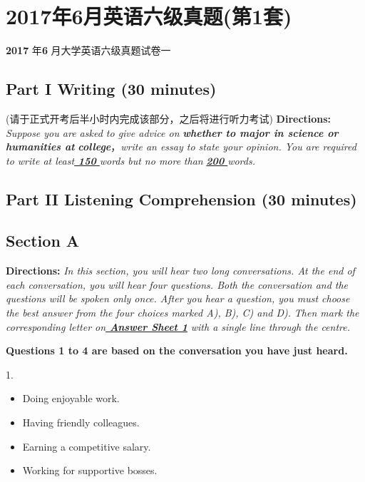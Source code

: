 \documentclass[UTF8,11pt]{ctexart}
\begin{document}
\section*{2017年6月英语六级真题(第1套)}
\textbf{2017} 年\textbf{6} 月大学英语六级真题试卷一


\subsection*{\textbf{Part I} \textbf{Writing} \textbf{(30 minutes)}}


(请于正式开考后半小时内完成该部分，之后将进行听力考试) \textbf{Directions:}\textit{ Suppose you are asked to give advice on}\textbf{\textit{ whether to major in science or humanities at}} \textbf{\textit{college}}，\textit{write an essay to state your opinion. You are required to write at least}\textbf{\textit{\uline{ 150}}}\textit{\uline{ }}\textit{words but no more} \textit{than}\textbf{\textit{ }}\textbf{\textit{\uline{200}}}\textit{\uline{ }}\textit{words.}


\subsection*{\textbf{Part II} \textbf{Listening Comprehension} \textbf{(30 minutes)}}


\subsection*{\textbf{Section A}}


\textbf{Directions:}\textit{ In this section, you will hear two long conversations. At the end of each conversation, you} \textit{will hear four questions. Both the conversation and the questions will be spoken only once. After you} \textit{hear a question, you must choose the best answer from the four choices marked A), B), C) and D).} \textit{Then mark the corresponding letter on}\textbf{\textit{\uline{ Answer Sheet 1}}}\textit{ with a single line through the centre.}


\textbf{Questions 1 to 4 are based on the conversation you have just heard.}


1.


\begin{itemize}[leftmargin=2em,itemsep=.2em,topsep=.4em]\item[A.] Doing enjoyable work.
\item[B.] Having friendly colleagues.
\item[C.] Earning a competitive salary.
\item[D.] Working for supportive bosses.
\end{itemize}
\end{document}

